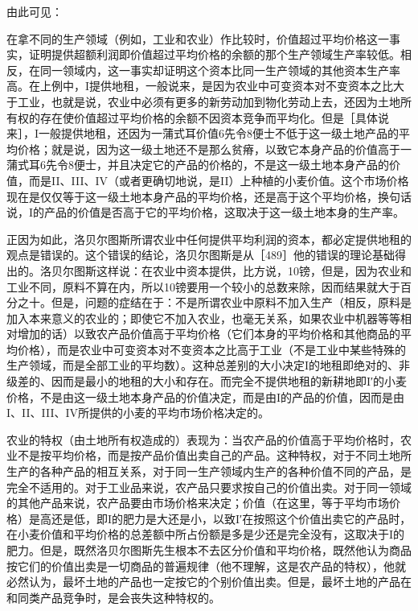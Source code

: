 由此可见：

在拿不同的生产领域（例如，工业和农业）作比较时，价值超过平均价格这一事实，证明提供超额利润即价值超过平均价格的余额的那个生产领域生产率较低。相反，在同一领域内，这一事实却证明这个资本比同一生产领域的其他资本生产率高。在上例中，I提供地租，一般说来，是因为农业中可变资本对不变资本之比大于工业，也就是说，农业中必须有更多的新劳动加到物化劳动上去，还因为土地所有权的存在使价值超过平均价格的余额不因资本竞争而平均化。但是［具体说来］，I一般提供地租，还因为一蒲式耳价值6先令8便士不低于这一级土地产品的平均价格；就是说，因为这一级土地还不是那么贫瘠，以致它本身产品的价值高于一蒲式耳6先令8便士，并且决定它的产品的价格的，不是这一级土地本身产品的价值，而是II、III、IV（或者更确切地说，是II）上种植的小麦价值。这个市场价格现在是仅仅等于这一级土地本身产品的平均价格，还是高于这个平均价格，换句话说，I的产品的价值是否高于它的平均价格，这取决于这一级土地本身的生产率。

正因为如此，洛贝尔图斯所谓农业中任何提供平均利润的资本，都必定提供地租的观点是错误的。这个错误的结论，洛贝尔图斯是从［489］他的错误的理论基础得出的。洛贝尔图斯这样说：在农业中资本提供，比方说，10镑，但是，因为农业和工业不同，原料不算在内，所以10镑要用一个较小的总数来除，因而结果就大于百分之十。但是，问题的症结在于：不是所谓农业中原料不加入生产（相反，原料是加入本来意义的农业的；即使它不加入农业，也毫无关系，如果农业中机器等等相对增加的话）以致农产品价值高于平均价格（它们本身的平均价格和其他商品的平均价格），而是农业中可变资本对不变资本之比高于工业（不是工业中某些特殊的生产领域，而是全部工业的平均数）。这种总差别的大小决定I的地租即绝对的、非级差的、因而是最小的地租的大小和存在。而完全不提供地租的新耕地即I′的小麦价格，不是由这一级土地本身产品的价值决定，而是由I的产品的价值，因而是由I、II、III、IV所提供的小麦的平均市场价格决定的。

农业的特权（由土地所有权造成的）表现为：当农产品的价值高于平均价格时，农业不是按平均价格，而是按产品价值出卖自己的产品。这种特权，对于不同土地所生产的各种产品的相互关系，对于同一生产领域内生产的各种价值不同的产品，是完全不适用的。对于工业品来说，农产品只要求按自己的价值出卖。对于同一领域的其他产品来说，农产品要由市场价格来决定；价值（在这里，等于平均市场价格）是高还是低，即I的肥力是大还是小，以致I′在按照这个价值出卖它的产品时，在小麦价值和平均价格的总差额中所占份额是多是少还是完全没有，这取决于I的肥力。但是，既然洛贝尔图斯先生根本不去区分价值和平均价格，既然他认为商品按它们的价值出卖是一切商品的普遍规律（他不理解，这是农产品的特权），他就必然认为，最坏土地的产品也一定按它的个别价值出卖。但是，最坏土地的产品在和同类产品竞争时，是会丧失这种特权的。

